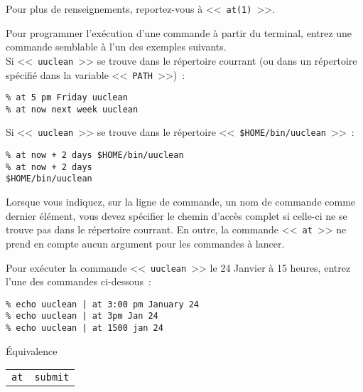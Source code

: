 Pour plus de renseignements, reportez-vous {\`a} <<~{\tt at(1)}~>>.

\begin{example}
Pour programmer l'ex{\'e}cution d'une commande {\`a} partir du terminal, entrez une commande
semblable {\`a} l'un des exemples suivants.\\
Si <<~{\tt uuclean}~>> se trouve dans le r{\'e}pertoire courrant (ou dans un r{\'e}pertoire sp{\'e}cifi{\'e} dans la
variable <<~{\tt PATH}~>>)~:
\begin{verbatim}
% at 5 pm Friday uuclean
% at now next week uuclean
\end{verbatim}
Si <<~{\tt uuclean}~>> se trouve dans le r{\'e}pertoire <<~\verb=$HOME/bin/uuclean=~>>~:
\begin{verbatim}
% at now + 2 days $HOME/bin/uuclean
% at now + 2 days
$HOME/bin/uuclean
\end{verbatim}
\end{example}

\begin{remarque}
Lorsque vous indiquez, sur la ligne de commande, un nom de commande
comme dernier {\'e}l{\'e}ment, vous devez sp{\'e}cifier le chemin d'acc{\`e}s complet si
celle-ci ne se trouve pas dans le r{\'e}pertoire courrant. En outre, la
commande <<~{\tt at}~>> ne prend en compte aucun argument pour les
commandes {\`a} lancer.
\end{remarque}

\begin{example}
Pour ex{\'e}cuter la commande <<~{\tt uuclean}~>> le 24 Janvier {\`a} 15 heures, entrez l'une des
commandes ci-dessous~:
\begin{verbatim}
% echo uuclean | at 3:00 pm January 24
% echo uuclean | at 3pm Jan 24
% echo uuclean | at 1500 jan 24
\end{verbatim}
\end{example}

\begin{definition}{\'{E}quivalence}
\begin{center}
\begin{tabular}{|c|c|}
	\hline
		{\Unix}		&	{\OpenVMS}			\\
	\hline \hline
		{\tt at}		&	{\tt submit}			\\
	\hline
\end{tabular}
\end{center}
\end{definition}

